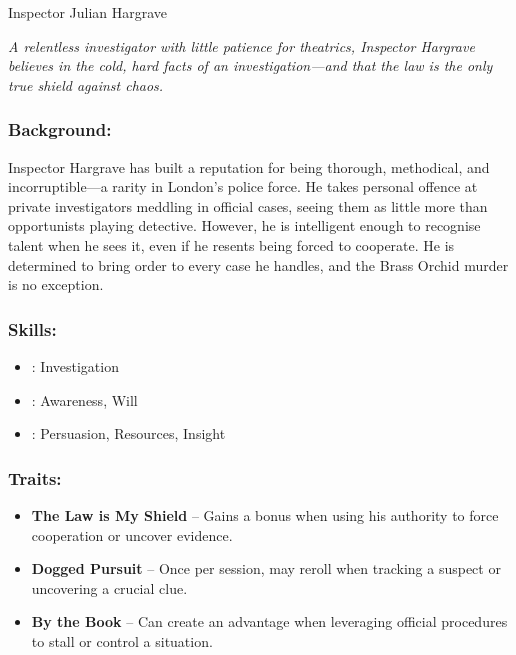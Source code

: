 \begin{WyrdFullNPC}[%
		name=Inspector Julian Hargrave,%
		description=By-the-Book Investigator,%
		float=!t%
	]{Inspector Julian Hargrave}
	
    \emph{A relentless investigator with little patience for theatrics, Inspector Hargrave believes in the cold, hard facts of an investigation—and that the law is the only true shield against chaos.}
    
    \subsubsection*{Background:}
    Inspector Hargrave has built a reputation for being thorough, methodical, and incorruptible—a rarity in London’s police force. He takes personal offence at private investigators meddling in official cases, seeing them as little more than opportunists playing detective. However, he is intelligent enough to recognise talent when he sees it, even if he resents being forced to cooperate. He is determined to bring order to every case he handles, and the Brass Orchid murder is no exception.

    \subsubsection*{Skills:}
    \begin{itemize}
       \item \Expert: Investigation
        \item \Skilled: Awareness, Will
        \item \Novice: Persuasion, Resources, Insight
    \end{itemize}
    
    \subsubsection*{Traits:}
    \begin{itemize}
        \item \textbf{The Law is My Shield} – Gains a bonus when using his authority to force cooperation or uncover evidence.
        \item \textbf{Dogged Pursuit} – Once per session, may reroll when tracking a suspect or uncovering a crucial clue.
        \item \textbf{By the Book} – Can create an advantage when leveraging official procedures to stall or control a situation.
    \end{itemize}
\end{WyrdFullNPC}

